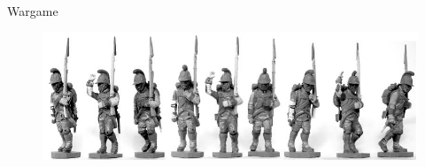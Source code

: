 
\begin{center}

\fontsize{35}{70}\selectfont\sffamily Wargame\\ \vspace{1cm}

\end{center}


\begin{figure}[htb]
\begin{center}
\includegraphics[scale=0.6]{Images/frontpage_pic.png}
\end{center}
\end{figure}

